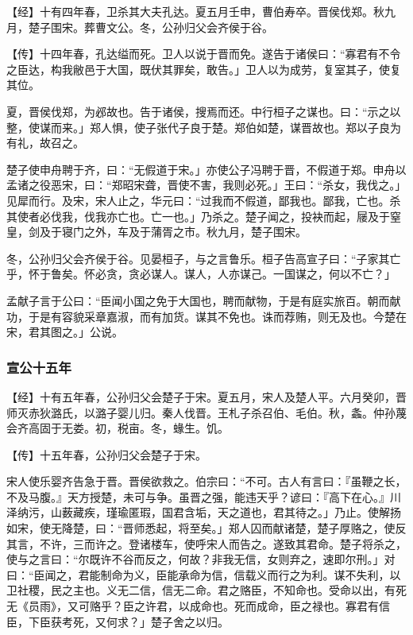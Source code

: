 \documentclass[]{article}
\begin{document}
【经】十有四年春，卫杀其大夫孔达。夏五月壬申，曹伯寿卒。晋侯伐郑。秋九月，楚子围宋。葬曹文公。冬，公孙归父会齐侯于谷。

【传】十四年春，孔达缢而死。卫人以说于晋而免。遂告于诸侯曰：``寡君有不令之臣达，构我敝邑于大国，既伏其罪矣，敢告。」卫人以为成劳，复室其子，使复其位。

夏，晋侯伐郑，为邲故也。告于诸侯，搜焉而还。中行桓子之谋也。曰：``示之以整，使谋而来。」郑人惧，使子张代子良于楚。郑伯如楚，谋晋故也。郑以子良为有礼，故召之。

楚子使申舟聘于齐，曰：``无假道于宋。」亦使公子冯聘于晋，不假道于郑。申舟以孟诸之役恶宋，曰：``郑昭宋聋，晋使不害，我则必死。」王曰：``杀女，我伐之。」见犀而行。及宋，宋人止之，华元曰：``过我而不假道，鄙我也。鄙我，亡也。杀其使者必伐我，伐我亦亡也。亡一也。」乃杀之。楚子闻之，投袂而起，屦及于窒皇，剑及于寝门之外，车及于蒲胥之市。秋九月，楚子围宋。

冬，公孙归父会齐侯于谷。见晏桓子，与之言鲁乐。桓子告高宣子曰：``子家其亡乎，怀于鲁矣。怀必贪，贪必谋人。谋人，人亦谋己。一国谋之，何以不亡？」

孟献子言于公曰：``臣闻小国之免于大国也，聘而献物，于是有庭实旅百。朝而献功，于是有容貌采章嘉淑，而有加货。谋其不免也。诛而荐贿，则无及也。今楚在宋，君其图之。」公说。

\hypertarget{header-n1466}{%
\subsubsection{宣公十五年}\label{header-n1466}}

【经】十有五年春，公孙归父会楚子于宋。夏五月，宋人及楚人平。六月癸卯，晋师灭赤狄潞氏，以潞子婴儿归。秦人伐晋。王札子杀召伯、毛伯。秋，螽。仲孙蔑会齐高固于无娄。初，税亩。冬，蝝生。饥。

【传】十五年春，公孙归父会楚子于宋。

宋人使乐婴齐告急于晋。晋侯欲救之。伯宗曰：``不可。古人有言曰：『虽鞭之长，不及马腹。』天方授楚，未可与争。虽晋之强，能违天乎？谚曰：『高下在心。』川泽纳污，山薮藏疾，瑾瑜匿瑕，国君含垢，天之道也，君其待之。」乃止。使解扬如宋，使无降楚，曰：``晋师悉起，将至矣。」郑人囚而献诸楚，楚子厚赂之，使反其言，不许，三而许之。登诸楼车，使呼宋人而告之。遂致其君命。楚子将杀之，使与之言曰：``尔既许不谷而反之，何故？非我无信，女则弃之，速即尔刑。」对曰：``臣闻之，君能制命为义，臣能承命为信，信载义而行之为利。谋不失利，以卫社稷，民之主也。义无二信，信无二命。君之赂臣，不知命也。受命以出，有死无《员雨》，又可赂乎？臣之许君，以成命也。死而成命，臣之禄也。寡君有信臣，下臣获考死，又何求？」楚子舍之以归。
\end{document}
